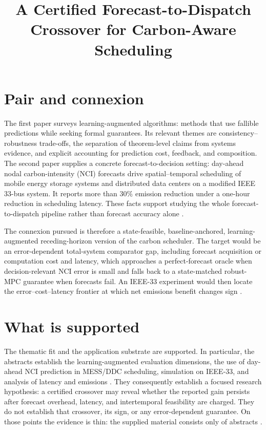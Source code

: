\documentclass{article}
\title{A Certified Forecast-to-Dispatch Crossover for Carbon-Aware Scheduling}
\begin{document}
\maketitle

\section{Pair and connexion}

The first paper surveys learning-augmented algorithms: methods that use fallible predictions while seeking formal guarantees.  Its relevant themes are consistency--robustness trade-offs, the separation of theorem-level claims from systems evidence, and explicit accounting for prediction cost, feedback, and composition.  The second paper supplies a concrete forecast-to-decision setting: day-ahead nodal carbon-intensity (NCI) forecasts drive spatial--temporal scheduling of mobile energy storage systems and distributed data centers on a modified IEEE 33-bus system.  It reports more than \(30\%\) emission reduction under a one-hour reduction in scheduling latency.  These facts support studying the whole forecast-to-dispatch pipeline rather than forecast accuracy alone .

The connexion pursued is therefore a state-feasible, baseline-anchored, learning-augmented receding-horizon version of the carbon scheduler.  The target would be an error-dependent total-system comparator gap, including forecast acquisition or computation cost and latency, which approaches a perfect-forecast oracle when decision-relevant NCI error is small and falls back to a state-matched robust-MPC guarantee when forecasts fail.  An IEEE-33 experiment would then locate the error--cost--latency frontier at which net emissions benefit changes sign .

\section{What is supported}

The thematic fit and the application substrate are supported.  In particular, the abstracts establish the learning-augmented evaluation dimensions, the use of day-ahead NCI prediction in MESS/DDC scheduling, simulation on IEEE-33, and analysis of latency and emissions .  They consequently establish a focused research hypothesis: a certified crossover may reveal whether the reported gain persists after forecast overhead, latency, and intertemporal feasibility are charged.  They do not establish that crossover, its sign, or any error-dependent guarantee.  On those points the evidence is thin: the supplied material consists only of abstracts .
\end{document}
